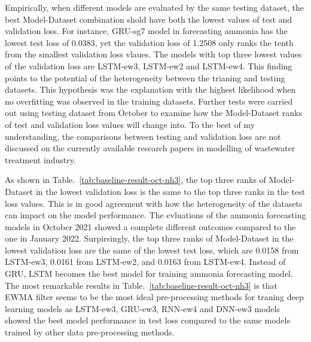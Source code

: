 Empirically, when different models are evaluated by the same testing dataset, the best Model-Dataset combination shold have both the lowest values of test and validation loss. For instance, GRU-sg7 model in forecasting ammonia has the lowest test loss of 0.0383, yet the validation loss of 1.2508 only ranks the tenth from the smallest validation loss vlaues. The models with top three lowest values of the validation loss are LSTM-ew3, LSTM-ew2 and LSTM-ew4. This finding points to the potential of the heterogeneity between the trianing and testing datasets. This hypothesis was the explanation with the highest likelihood when no overfitting was observed in the training datasets. Further tests were carried out using testing dataset from October to examine how the Model-Dataset ranks of test and validation loss values will change into. To the best of my understanding, the comparisons between testing and validation loss are not discussed on the currently available research papers in modelling of wastewater treatment industry.

As shown in Table.~\ref{tab:baseline-result-oct-nh3}, the top three ranks of Model-Dataset in the lowest validation loss is the same to the top three ranks in the test loss values. This is in good agreement with how the heterogeneity of the datasets can impact on the model performance. The evluations of the ammonia forecasting models in October 2021 showed a complete different outcomes compared to the one in January 2022. Surpirsingly, the top three ranks of Model-Dataset in the lowest validation loss are the same of the lowest test loss, which are 0.0158 from LSTM-ew3, 0.0161 from LSTM-ew2, and 0.0163 from LSTM-ew4. Instead of GRU, LSTM becomes the best model for training ammonia forecasting model. The most remarkable results in Table.~\ref{tab:baseline-result-oct-nh3} is that EWMA filter seems to be the most ideal pre-processing methods for traning deep learning models as LSTM-ew3, GRU-ew3, RNN-ew4 and DNN-ew3 models showed the best model performance in test loss compared to the same models trained by other data pre-processing methods.

